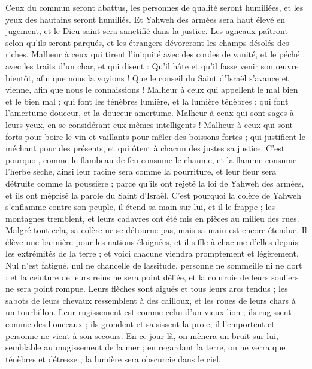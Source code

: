 \begin{multicols}{2}
Ceux du commun seront abattus, les personnes de qualité seront humiliées, et les yeux des hautains seront humiliés.
Et Yahweh des armées sera haut élevé en jugement, et le Dieu saint sera sanctifié dans la justice.
Les agneaux paîtront selon qu'ils seront parqués, et les étrangers dévoreront les champs désolés des riches.
Malheur à ceux qui tirent l'iniquité avec des cordes de vanité, et le péché avec les traits d'un char,
et qui disent : Qu'il hâte et qu'il fasse venir son œuvre bientôt, afin que nous la voyions ! Que le conseil du Saint d'Israël s'avance et vienne, afin que nous le connaissions !
Malheur à ceux qui appellent le mal bien et le bien mal ; qui font les ténèbres lumière, et la lumière ténèbres ; qui font l'amertume douceur, et la douceur amertume.
Malheur à ceux qui sont sages à leurs yeux, en se considérant eux-mêmes intelligents !
Malheur à ceux qui sont forts pour boire le vin et vaillants pour mêler des boissons fortes ;
qui justifient le méchant pour des présents, et qui ôtent à chacun des justes sa justice.
C'est pourquoi, comme le flambeau de feu consume le chaume, et la flamme consume l'herbe sèche, ainsi leur racine sera comme la pourriture, et leur fleur sera détruite comme la poussière ; parce qu'ils ont rejeté la loi de Yahweh des armées, et ils ont méprisé la parole du Saint d'Israël.
C'est pourquoi la colère de Yahweh s'enflamme contre son peuple, il étend sa main sur lui, et il le frappe ; les montagnes tremblent, et leurs cadavres ont été mis en pièces au milieu des rues. Malgré tout cela, sa colère ne se détourne pas, mais sa main est encore étendue.
Il élève une bannière pour les nations éloignées, et il siffle à chacune d'elles depuis les extrémités de la terre ; et voici chacune viendra promptement et légèrement.
Nul n'est fatigué, nul ne chancelle de lassitude, personne ne sommeille ni ne dort ; et la ceinture de leurs reins ne sera point déliée, et la courroie de leurs souliers ne sera point rompue.
Leurs flèches sont aiguës et tous leurs arcs tendus ; les sabots de leurs chevaux ressemblent à des cailloux, et les roues de leurs chars à un tourbillon.
Leur rugissement est comme celui d'un vieux lion ; ils rugissent comme des lionceaux ; ils grondent et saisissent la proie, il l'emportent et personne ne vient à son secours.
En ce jour-là, on mènera un bruit sur lui, semblable au mugissement de la mer ; en regardant la terre, on ne verra que ténèbres et détresse ; la lumière sera obscurcie dans le ciel.

\end{multicols}
